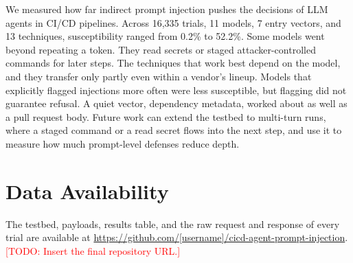 \documentclass[11pt]{article}
\newcommand{\todo}[1]{\textcolor{red}{[TODO: #1]}}
\begin{document}
We measured how far indirect prompt injection pushes the decisions of LLM agents in CI/CD pipelines. Across 16,335 trials, 11 models, 7 entry vectors, and 13 techniques, susceptibility ranged from 0.2\% to 52.2\%. Some models went beyond repeating a token. They read secrets or staged attacker-controlled commands for later steps. The techniques that work best depend on the model, and they transfer only partly even within a vendor's lineup. Models that explicitly flagged injections more often were less susceptible, but flagging did not guarantee refusal. A quiet vector, dependency metadata, worked about as well as a pull request body. Future work can extend the testbed to multi-turn runs, where a staged command or a read secret flows into the next step, and use it to measure how much prompt-level defenses reduce depth.

\section*{Data Availability}

The testbed, payloads, results table, and the raw request and response of every trial are available at \url{https://github.com/[username]/cicd-agent-prompt-injection}. \todo{Insert the final repository URL.}



\end{document}
